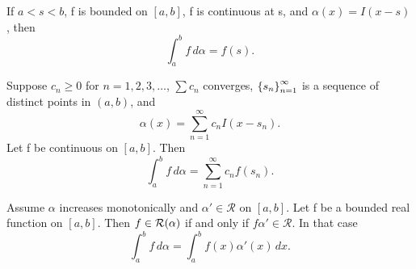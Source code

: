 \begin{theorem} %
  \label{thm:chap6:integral_unit_step}
  If $a < s < b$, f is bounded on $[a, b]$, f is continuous at s, and
  $\alpha(x) = I(x-s)$, then
  \[ \int_a^b f \, d\alpha = f(s). \]
\end{theorem}



\begin{theorem} %
  \label{thm:chap6:integral_step_sum}
  Suppose $c_n \ge 0$ for $n=1, 2, 3, \dots$, $\sum c_n$ converges,
  $\left\{ s_n \right\}_{n=1}^\infty$ is a sequence of distinct points in $(a, b)$, and
  \begin{equation} \label{eq:chap6:alpha_step_sum}
    \alpha(x) = \sum_{n=1}^\infty c_n I(x - s_n).
  \end{equation}
  Let f be continuous on $[a, b]$. Then
  \begin{equation} \label{eq:chap6:integral_step_sum_result}
    \int_a^b f \, d\alpha = \sum_{n=1}^\infty c_n f(s_n).
  \end{equation}
\end{theorem}

\begin{theorem} %
  \label{thm:chap6:rs_vs_riemann}
  Assume $\alpha$ increases monotonically and $\alpha' \in
  \mathcal{R}$ on $[a, b]$. Let f be a bounded real function on $[a, b]$.
  Then $f \in \mathcal{R}(\alpha)$ if and only if $f\alpha' \in
  \mathcal{R}$. In that case
  \[ \int_a^b f \, d\alpha = \int_a^b f(x)\alpha'(x) \, dx. \]
\end{theorem}

